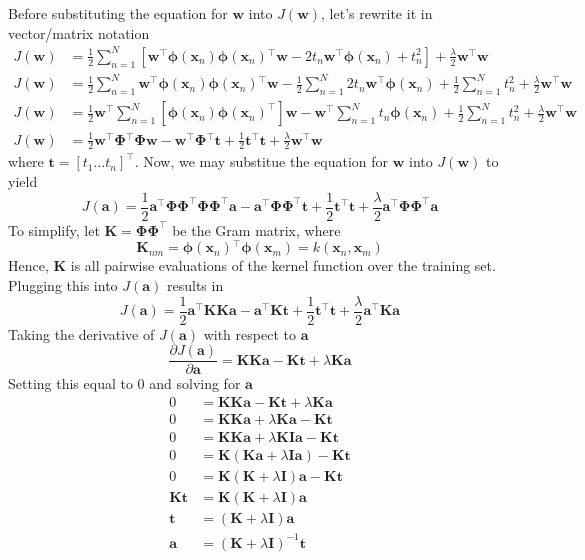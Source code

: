 \documentclass[12pt]{article}
\newcommand{\x}{\mathbf{x}}
\newcommand{\w}{\mathbf{w}}
\newcommand{\tVec}{\mathbf{t}}
\newcommand{\aVec}{\mathbf{a}}
\newcommand{\sumN}{\sum \limits_{n=1}^N}
\newcommand{\Ja}{J\left(\aVec{}\right)}
\newcommand{\Jw}{J\left(\w{}\right)}
\newcommand{\wTransW}{\w{}^\top\w{}}
\newcommand{\tTransT}{\tVec{}^\top\tVec{}}
\newcommand{\dJda}{\frac{\partial \Ja{}}{\partial \aVec{}}}
\newcommand{\phiXn}{\mathbf{\phi}\left(\x{}_n\right)}
\newcommand{\phiXm}{\mathbf{\phi}\left(\x{}_m\right)}
\newcommand{\wTransPhi}{\w{}^\top\phiXn{}}
\newcommand{\phiTransW}{\phiXn{}^\top\w{}}
\newcommand{\PhiMat}{\mathbf{\Phi}}
\newcommand{\PhiPhiTrans}{\PhiMat\PhiMat^\top}
\newcommand{\K}{\mathbf{K}}
\newcommand{\I}{\mathbf{I}}
\begin{document}
Before substituting the equation for $\w{}$ into $\Jw{}$, let's rewrite it in
vector/matrix notation
%
\begin{align*}
  \Jw{} &= \frac{1}{2}\sumN{}
  \left[\wTransPhi{}\phiTransW{} - 2t_n\wTransPhi{} + t_n^2\right] +
  \frac{\lambda}{2}\wTransW{}\\
  \Jw{} &= \frac{1}{2}\sumN{}\wTransPhi{}\phiTransW{} -
  \frac{1}{2}\sumN{}2t_n\wTransPhi{} +
  \frac{1}{2}\sumN{}t_n^2 +
  \frac{\lambda}{2}\wTransW{}\\
  \Jw{} &= \frac{1}{2}\w{}^\top\sumN{}\left[\phiXn{}\phiXn^\top\right]\w{} -
  \w{}^\top\sumN{}t_n\phiXn{} +
  \frac{1}{2}\sumN{}t_n^2 +
  \frac{\lambda}{2}\wTransW{}\\
  \Jw{} &= \frac{1}{2}\w{}^\top\PhiMat{}^\top\PhiMat{}\w{} -
  \w{}^\top\PhiMat{}^\top\tVec{} +
  \frac{1}{2}\tTransT{} +
  \frac{\lambda}{2}\wTransW{}
\end{align*}
%
where $\tVec{} = \left[t_1 \hdots t_n\right]^\top$. Now, we may substitue the
equation for $\w{}$ into $\Jw{}$ to yield
%
\begin{equation*}
\Ja{} = \frac{1}{2}\aVec{}^\top\PhiPhiTrans{}\PhiPhiTrans{}\aVec{} -
  \aVec{}^\top\PhiPhiTrans{}\tVec{} +
  \frac{1}{2}\tTransT{} +
  \frac{\lambda}{2}\aVec{}^\top\PhiPhiTrans{}\aVec{}
\end{equation*}
%
To simplify, let $\K{} = \PhiPhiTrans{}$ be the Gram matrix, where
%
\begin{equation*}
\K{}_{nm} = \phiXn{}^\top\phiXm{} = k\left(\x{}_n,\x{}_m\right)
\end{equation*}
%
Hence, $\K{}$ is all pairwise evaluations of the kernel function over the
training set. Plugging this into $\Ja{}$ results in
%
\begin{equation*}
  \Ja{} = \frac{1}{2}\aVec{}^\top\K{}\K{}\aVec{} -
  \aVec{}^\top\K{}\tVec{} +
  \frac{1}{2}\tTransT{} +
  \frac{\lambda}{2}\aVec{}^\top\K{}\aVec{}
\end{equation*}
%
Taking the derivative of $\Ja{}$ with respect to $\aVec{}$
\begin{equation*}
  \dJda = \K{}\K{}\aVec{} - \K{}\tVec{} + \lambda\K{}\aVec{}
\end{equation*}
%
Setting this equal to $0$ and solving for $\aVec{}$
\begin{align*}
  0 &= \K{}\K{}\aVec{} - \K{}\tVec{} + \lambda\K{}\aVec{}\\
  0 &= \K{}\K{}\aVec{} + \lambda\K{}\aVec{} - \K{}\tVec{}\\
  0 &= \K{}\K{}\aVec{} + \lambda\K{}\I{}\aVec{} - \K{}\tVec{}\\
  0 &= \K{}\left(\K{}\aVec{} + \lambda\I{}\aVec{}\right) - \K{}\tVec{}\\
  0 &= \K{}\left(\K{} + \lambda\I{}\right)\aVec{} - \K{}\tVec{}\\
  \K{}\tVec{} &= \K{}\left(\K{} + \lambda\I{}\right)\aVec{}\\
  \tVec{} &= \left(\K{} + \lambda\I{}\right)\aVec{}\\
  \aVec{} &= \left(\K{} + \lambda\I{}\right)^{-1}\tVec{}
\end{align*}
\end{document}
